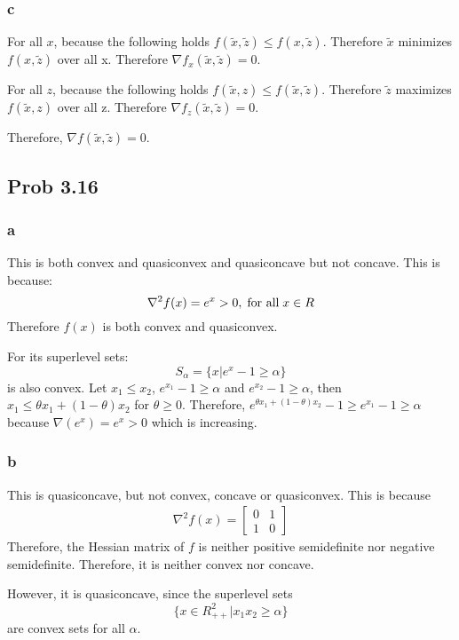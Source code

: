\documentclass[10pt,a4paper]{article}
\begin{document}
\subsubsection{c}
For all $x$, because the following holds $f(\tilde{x},\tilde{z})\leq f(x,\tilde{z})$. Therefore $\tilde{x}$ minimizes $f(x,\tilde{z})$ over all x. Therefore $\nabla f_x(\tilde{x},\tilde{z})=0$.

For all $z$, because the following holds $f(\tilde{x},z)\leq f(\tilde{x},\tilde{z})$. Therefore $\tilde{z}$ maximizes $f(\tilde{x},z)$ over all z. Therefore $\nabla f_z(\tilde{x},\tilde{z})=0$.

Therefore, $\nabla f(\tilde{x},\tilde{z})=0$.

\subsection{Prob 3.16}

\subsubsection{a}
This is both convex and quasiconvex and quasiconcave but not concave. This is because:
$$
\nabla^2f(x)=e^x>0, \text{\;for all\;} x\in R
$$
Therefore $f(x)$ is both convex and quasiconvex. 

For its superlevel sets:
$$
S_\alpha=\{x|e^x-1\geq \alpha\}
$$
is also convex. Let $x_1\leq x_2$, $e^{x_1}-1\geq \alpha$ and $e^{x_2}-1\geq \alpha$, then $x_1\leq \theta x_1+(1-\theta)x_2$ for $\theta\geq0$. Therefore, $e^{\theta x_1+(1-\theta)x_2}-1\geq  e^{x_1}-1\geq \alpha$ because $\nabla(e^x)=e^x>0$ which is increasing.

\subsubsection{b}
This is quasiconcave, but not convex, concave or quasiconvex. This is because
\begin{align*}
	\nabla^2f(x)=\begin{bmatrix}
	0 & 1\\
	1 & 0
	\end{bmatrix}
\end{align*}
Therefore, the Hessian matrix of $f$ is neither positive semidefinite nor negative semidefinite. Therefore, it is neither convex nor concave. 

However, it is quasiconcave, since the superlevel sets
$$
\{x\in R^2_{++}|x_1x_2\geq \alpha\}
$$
are convex sets for all $\alpha$.
\end{document}
